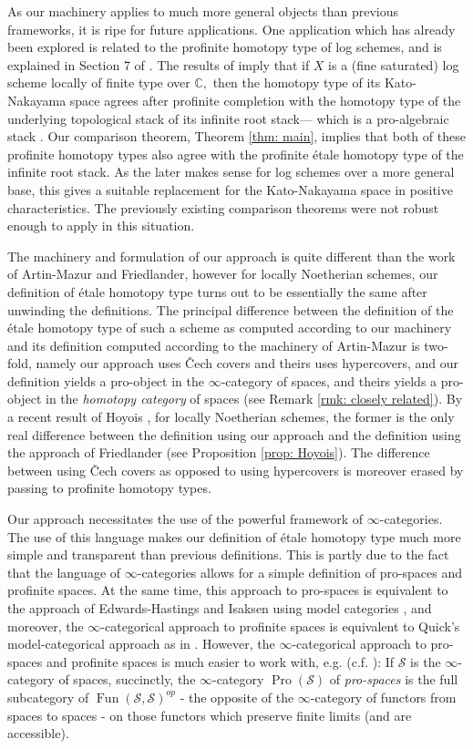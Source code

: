 \documentclass[12pt]{amsart}
\theoremstyle{definition}
\newcommand{\bC}{\mathbb{C}}
\newcommand{\cS}{\mathcal{S}}
\renewcommand{\i}{\infty}
\def\Pro{\operatorname{Pro}}
\def\Fun{\operatorname{Fun}}
\begin{document}
As our machinery applies to much more general objects than previous frameworks, it is ripe for future applications. One application which has already been explored is related to the profinite homotopy type of log schemes, and is explained in Section 7 of \cite{knhom}. The results of \cite{knhom} imply that if $X$ is a (fine saturated) log scheme locally of finite type over $\bC,$ then the homotopy type of its Kato-Nakayama space \cite{KN} agrees after profinite completion with the homotopy type of the underlying topological stack of its infinite root stack--- which is a pro-algebraic stack \cite{TV}. Our comparison theorem, Theorem \ref{thm: main}, implies that both of these profinite homotopy types also agree with the profinite \'etale homotopy type of the infinite root stack. As the later makes sense for log schemes over a more general base, this gives a suitable replacement for the Kato-Nakayama space in positive characteristics. The previously existing comparison theorems were not robust enough to apply in this situation.

The machinery and formulation of our approach is quite different than the work of Artin-Mazur and Friedlander, however for locally Noetherian schemes, our definition of \'etale homotopy type turns out to be essentially the same after unwinding the definitions. The principal difference between the definition of the \'etale homotopy type of such a scheme as computed according to our machinery and its definition computed according to the machinery of Artin-Mazur is two-fold, namely our approach uses \v{C}ech covers and theirs uses hypercovers, and our definition yields a pro-object in the $\i$-category of spaces, and theirs yields a pro-object in the \emph{homotopy category} of spaces (see Remark \ref{rmk: closely related}). By a recent result of Hoyois \cite{Hoyois}, for locally Noetherian schemes, the former is the only real difference between the definition using our approach and the definition using the approach of Friedlander (see Proposition \ref{prop: Hoyois}). The difference between using \v{C}ech covers as opposed to using  hypercovers is moreover erased by passing to profinite homotopy types.

Our approach necessitates the use of the powerful framework of $\i$-categories. The use of this language makes our definition of \'etale homotopy type much more simple and transparent than previous definitions. This is partly due to the fact that the language of $\i$-categories allows for a simple definition of pro-spaces and profinite spaces. At the same time, this approach to pro-spaces is equivalent to the approach of Edwards-Hastings and Isaksen \cite{edwardshastings,Isak1} using model categories \cite{prohomotopy}, and moreover, the $\i$-categorical approach to profinite spaces is equivalent to Quick's model-categorical approach as in \cite{Qu,Qu2}. However, the $\i$-categorical approach to pro-spaces and profinite spaces is much easier to work with, e.g. (c.f. \cite{dagxiii}): If $\cS$ is the $\i$-category of spaces, succinctly, the $\i$-category $\Pro\left(\cS\right)$ of \emph{pro-spaces} is the full subcategory of $\Fun\left(\cS,\cS\right)^{op}$ - the opposite of the $\i$-category of functors from spaces to spaces - on those functors which preserve finite limits (and are accessible). 
\end{document}
